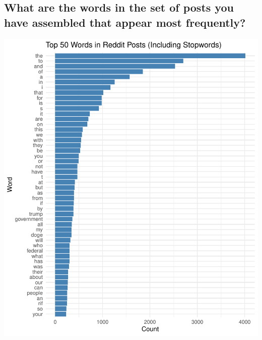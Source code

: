\documentclass[
  12pt]{article}
\begin{document}
\subsection{What are the words in the set of posts you have assembled
that appear most
frequently?}\label{what-are-the-words-in-the-set-of-posts-you-have-assembled-that-appear-most-frequently}

\includegraphics{paper_files/figure-pdf/unnamed-chunk-6-1.pdf}
\end{document}
